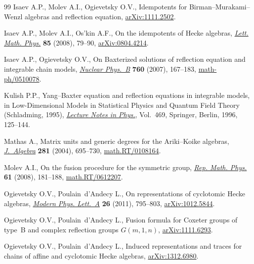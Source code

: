 \documentclass[pdftex]{sigma}
\begin{document}
\begin{thebibliography}{99}
Isaev A.P., Molev A.I., Ogievetsky O.V., Idempotents for
  Birman--Murakami--Wenzl algebras and ref\/lection equation, \href{http://arxiv.org/abs/1111.2502}{arXiv:1111.2502}.

Isaev A.P., Molev A.I., Os'kin A.F., On the idempotents of {H}ecke algebras,
  \href{http://dx.doi.org/10.1007/s11005-008-0254-7}{\textit{Lett. Math. Phys.}} \textbf{85} (2008), 79--90, \href{http://arxiv.org/abs/0804.4214}{arXiv:0804.4214}.

Isaev A.P., Ogievetsky O.V., On {B}axterized solutions of ref\/lection equation
  and integrable chain models, \href{http://dx.doi.org/10.1016/j.nuclphysb.2006.09.013}{\textit{Nuclear Phys.~B}} \textbf{760} (2007),
  167--183, \href{http://arxiv.org/abs/math-ph/0510078}{math-ph/0510078}.

Kulish P.P., Yang--{B}axter equation and ref\/lection equations in integrable
  models, in Low-Dimensional Mo\-dels in Statistical Physics and Quantum Field
  Theory ({S}chladming, 1995), \href{http://dx.doi.org/10.1007/BFb0102555}{\textit{Lecture Notes in Phys.}}, Vol.~469,
  Springer, Berlin, 1996, 125--144.

Mathas A., Matrix units and generic degrees for the {A}riki--{K}oike algebras,
  \href{http://dx.doi.org/10.1016/j.jalgebra.2004.07.021}{\textit{J.~Algebra}} \textbf{281} (2004), 695--730, \href{http://arxiv.org/abs/math.RT/0108164}{math.RT/0108164}.

Molev A.I., On the fusion procedure for the symmetric group, \href{http://dx.doi.org/10.1016/S0034-4877(08)80005-5}{\textit{Rep. Math.
  Phys.}} \textbf{61} (2008), 181--188, \href{http://arxiv.org/abs/math.RT/0612207}{math.RT/0612207}.


Ogievetsky O.V., Poulain~d'Andecy L., On representations of cyclotomic {H}ecke
  algebras, \href{http://dx.doi.org/10.1142/S0217732311035377}{\textit{Modern Phys. Lett.~A}} \textbf{26} (2011), 795--803,
  \href{http://arxiv.org/abs/1012.5844}{arXiv:1012.5844}.

Ogievetsky O.V., Poulain~d'Andecy L., Fusion formula for Coxeter groups of
  type~B and complex ref\/lection groups $G(m,1,n)$, \href{http://arxiv.org/abs/1111.6293}{arXiv:1111.6293}.


Ogievetsky O.V., Poulain~d'Andecy L., Induced representations and traces for
  chains of af\/f\/ine and cyclotomic Hecke algebras, \href{http://arxiv.org/abs/1312.6980}{arXiv:1312.6980}.


\end{thebibliography}\LastPageEnding
\end{document}
